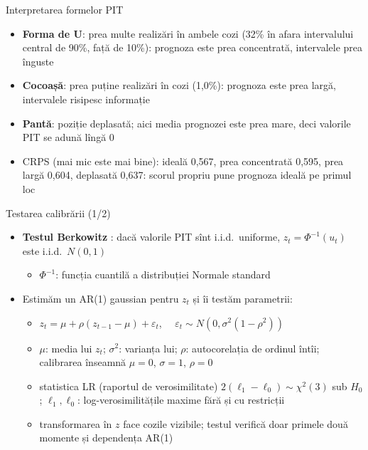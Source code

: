 \begin{frame}{Interpretarea formelor PIT}
\itemsize{\small}
\begin{itemize}
    \item \textbf{Forma de U}: prea multe realizări în ambele cozi (32\% în afara intervalului central de 90\%, față de 10\%): prognoza este prea concentrată, intervalele prea înguste
    \item \textbf{Cocoașă}: prea puține realizări în cozi (1{,}0\%): prognoza este prea largă, intervalele risipesc informație
    \item \textbf{Pantă}: poziție deplasată; aici media prognozei este prea mare, deci valorile PIT se adună lîngă 0
    \item CRPS (mai mic este mai bine): ideală 0{,}567, prea concentrată 0{,}595, prea largă 0{,}604, deplasată 0{,}637: scorul propriu pune prognoza ideală pe primul loc
\end{itemize}
\end{frame}

\begin{frame}{Testarea calibrării (1/2)}
\itemsize{\small}
\begin{itemize}
    \item \textbf{Testul Berkowitz} : dacă valorile PIT sînt i.i.d.\ uniforme, $z_t = \Phi^{-1}(u_t)$ este i.i.d.\ $N(0, 1)$
    \begin{itemize}
        \item $\Phi^{-1}$: funcția cuantilă a distribuției Normale standard
    \end{itemize}
    \item Estimăm un AR(1) gaussian pentru $z_t$ și îi testăm parametrii:
    \begin{itemize}
        \item $z_t = \mu + \rho(z_{t-1} - \mu) + \varepsilon_t$, $\quad \varepsilon_t \sim N(0, \sigma^2(1 - \rho^2))$
        \item $\mu$: media lui $z_t$; $\sigma^2$: varianța lui; $\rho$: autocorelația de ordinul întîi; calibrarea înseamnă $\mu = 0$, $\sigma = 1$, $\rho = 0$
        \item statistica LR (raportul de verosimilitate) $2(\ell_1 - \ell_0) \sim \chi^2(3)$ sub $H_0$; $\ell_1, \ell_0$: log-verosimilitățile maxime fără și cu restricții
        \item transformarea în $z$ face cozile vizibile; testul verifică doar primele două momente și dependența AR(1)
    \end{itemize}
\end{itemize}
\end{frame}


